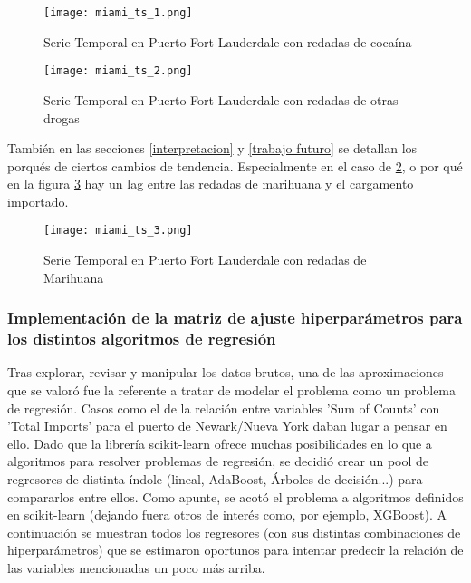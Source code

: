 \documentclass[12pt]{article}
\begin{document}
	\begin{figure}[H]
		\caption{\label{miami_ts_1} Serie Temporal en Puerto Fort Lauderdale con redadas de cocaína}
		\centering
		\hspace*{1cm}
		\texttt{[image: miami\_ts\_1.png]}
	\end{figure}

	\begin{figure}[H]
		\caption{\label{miami_ts_2} Serie Temporal en Puerto Fort Lauderdale con redadas de otras drogas}
		\centering
		\hspace*{1cm}
		\texttt{[image: miami\_ts\_2.png]}
	\end{figure}

	También en las secciones \ref{interpretacion} y \ref{trabajo futuro} se detallan los porqués de ciertos cambios de tendencia. Especialmente en el caso de \ref{miami_ts_2}, o por qué en la figura \ref{miami_ts_3} hay un lag entre las redadas de marihuana y el cargamento importado.
	
	\begin{figure}[H]
		\caption{\label{miami_ts_3} Serie Temporal en Puerto Fort Lauderdale con redadas de Marihuana}
		\centering
		\hspace*{1cm}
		\texttt{[image: miami\_ts\_3.png]}
	\end{figure}
	
	
	
	\subsubsection{Implementación de la matriz de ajuste hiperparámetros para los distintos algoritmos de regresión}
	Tras explorar, revisar y manipular los datos brutos, una de las aproximaciones que se valoró fue la referente a tratar de modelar el problema como un problema de regresión. Casos como el de la relación entre variables 'Sum of Counts' con 'Total Imports' para el puerto de Newark/Nueva York daban lugar a pensar en ello. Dado que la librería scikit-learn ofrece muchas posibilidades en lo que a algoritmos para resolver problemas de regresión, se decidió crear un pool de regresores de distinta índole (lineal, AdaBoost, Árboles de decisión...) para compararlos entre ellos. Como apunte, se acotó el problema a algoritmos definidos en scikit-learn (dejando fuera otros de interés como, por ejemplo, XGBoost). A continuación se muestran todos los regresores (con sus distintas combinaciones de hiperparámetros) que se estimaron oportunos para intentar predecir la relación de las variables mencionadas un poco más arriba.
	
\end{document}
